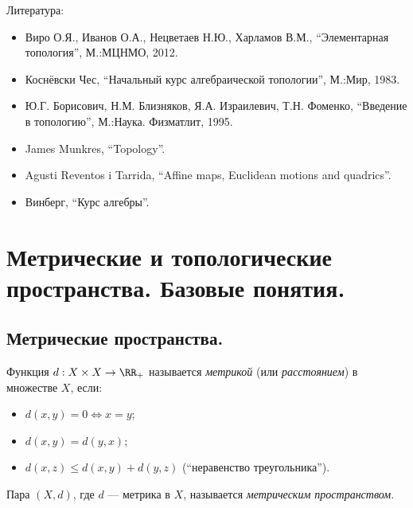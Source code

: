 \documentclass[12pt,a4paper]{article}
\date{}
\begin{document}
    \maketitle

    \listoftodos[TODOs]

    \tableofcontents

    \vspace{2em}

    Литература:
    \begin{itemize}
        \item Виро О.Я., Иванов О.А., Нецветаев Н.Ю., Харламов В.М., ``Элементарная топология'', М.:МЦНМО, 2012.
        \item Коснёвски Чес, ``Начальный курс алгебраической топологии'', М.:Мир, 1983.
        \item Ю.Г. Борисович, Н.М. Близняков, Я.А. Израилевич, Т.Н. Фоменко, ``Введение в топологию'', М.:Наука. Физматлит, 1995.
        \item James Munkres, ``Topology''.
        \item Agusti Reventos i Tarrida, ``Affine maps, Euclidean motions and quadrics''.
        \item Винберг, ``Курс алгебры''.
    \end{itemize}

    \section{Метрические и топологические пространства. Базовые понятия.}
    
    \subsection{Метрические пространства.}

    \begin{definition}
        Функция $d: X \times X \to \RR_+$ называется \emph{метрикой} (или \emph{расстоянием}) в множестве $X$, если:
        \begin{itemize}
            \item $d(x, y) = 0 \Leftrightarrow x = y$;
            \item $d(x, y) = d(y, x)$;
            \item $d(x, z) \leqslant d(x, y) + d(y, z)$ (``неравенство треугольника'').
        \end{itemize}
        Пара $(X, d)$, где $d$ --- метрика в $X$, называется \emph{метрическим пространством}.
    \end{definition}
\end{document}
